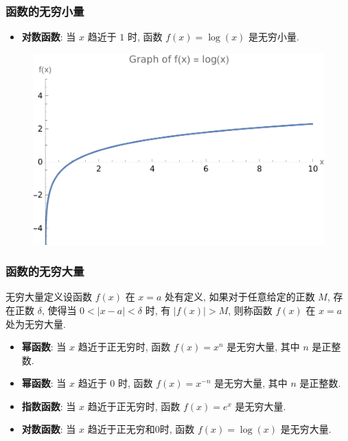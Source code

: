 \documentclass[
10pt, 
aspectratio=43, 
]{beamer}
\begin{document}
\begin{frame}
\frametitle{函数的无穷小量}
\begin{itemize}
\item \textbf{对数函数}: 当 $x$ 趋近于 $1$ 时, 函数 $f(x) = \log(x)$ 是无穷小量. 
\end{itemize}
\begin{figure}
    \centering
    \includegraphics[width=0.5\linewidth]{log.png}
    \label{fig: enter-label}
\end{figure}
\end{frame}


\begin{frame}
\frametitle{函数的无穷大量}


\begin{block}{无穷大量定义}设函数 $f(x)$ 在 $x=a$ 处有定义, 如果对于任意给定的正数 $M$, 存在正数 $\delta$, 使得当 $0 < |x-a| < \delta$ 时, 有 $|f(x)| > M$, 则称函数 $f(x)$ 在 $x=a$ 处为无穷大量. 
\end{block}
\begin{itemize}
\item<1-> \textbf{幂函数}: 当 $x$ 趋近于正无穷时, 函数 $f(x) = x^n$ 是无穷大量, 其中 $n$ 是正整数. 
\item<1-> \textbf{幂函数}: 当 $x$ 趋近于 $0$ 时, 函数 $f(x) = x^{-n}$ 是无穷大量, 其中 $n$ 是正整数. 
\item<2-> \textbf{指数函数}: 当 $x$ 趋近于正无穷时, 函数 $f(x) = e^x$ 是无穷大量. 
\item<4-> \textbf{对数函数}: 当 $x$ 趋近于正无穷和$0$时, 函数 $f(x) = \log(x)$ 是无穷大量. 
\end{itemize}
\end{frame}
\end{document}
